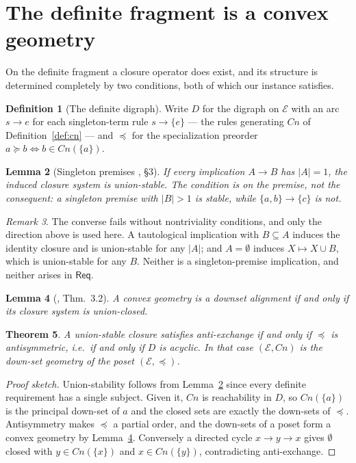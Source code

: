 \documentclass[11pt,reqno]{amsart}
\theoremstyle{plain}
\newtheorem{theorem}{Theorem}[section]
\newtheorem{lemma}[theorem]{Lemma}
\theoremstyle{definition}
\newtheorem{definition}[theorem]{Definition}
\theoremstyle{remark}
\newtheorem{remark}[theorem]{Remark}
\newcommand{\El}{\mathcal{E}}
\newcommand{\Law}{\mathsf{Req}}
\begin{document}
\section{The definite fragment is a convex geometry}\label{sec:convex}

On the definite fragment a closure operator does exist, and its structure is
determined completely by two conditions, both of which our instance satisfies.

\begin{definition}[The definite digraph]\label{def:digraph}
Write $D$ for the digraph on $\El$ with an arc $s \to e$ for each singleton-term
rule $s \to \{e\}$ --- the rules generating $Cn$ of
Definition~\ref{def:cn} --- and $\preceq$ for the specialization preorder
$a \succeq b \iff b \in Cn(\{a\})$.
\end{definition}

\begin{lemma}[Singleton premises \cite{caspardmonjardet2004}, \S3]\label{lem:cm}
If every implication $A \to B$ has $|A| = 1$, the induced closure system is
union-stable. The condition is on the \emph{premise}, not the consequent: a
singleton premise with $|B| > 1$ is stable, while $\{a,b\} \to \{c\}$ is not.
\end{lemma}

\begin{remark}
The converse fails without nontriviality conditions, and only the direction above
is used here. A tautological implication with $B \subseteq A$ induces the identity
closure and is union-stable for any $|A|$; and $A = \emptyset$ induces
$X \mapsto X \cup B$, which is union-stable for any $B$. Neither is a
singleton-premise implication, and neither arises in $\Law$.
\end{remark}

\begin{lemma}[\cite{edelmanjamison1985}, Thm.\ 3.2]\label{lem:ej}
A convex geometry is a downset alignment if and only if its closure system is
union-closed.
\end{lemma}

\begin{theorem}\label{thm:convex}
A union-stable closure satisfies anti-exchange if and only if $\preceq$ is
antisymmetric, i.e.\ if and only if $D$ is acyclic. In that case $(\El, Cn)$ is
the down-set geometry of the poset $(\El, \preceq)$.
\end{theorem}

\begin{proof}[Proof sketch]
Union-stability follows from Lemma~\ref{lem:cm} since every definite requirement
has a single subject. Given it, $Cn$ is reachability in $D$, so $Cn(\{a\})$ is the
principal down-set of $a$ and the closed sets are exactly the down-sets of
$\preceq$. Antisymmetry makes $\preceq$ a partial order, and the down-sets of a
poset form a convex geometry by Lemma~\ref{lem:ej}. Conversely a directed cycle
$x \to y \to x$ gives $\emptyset$ closed with $y \in Cn(\{x\})$ and
$x \in Cn(\{y\})$, contradicting anti-exchange.
\end{proof}
\end{document}
